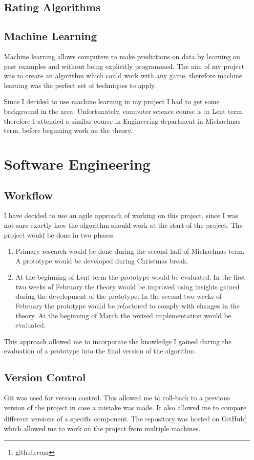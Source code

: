 \documentclass[12pt,a4paper]{book}
\begin{document}
\subsection{Rating Algorithms}

\subsection{Machine Learning}
Machine learning allows computers to make predictions on data by learning on past examples and without being explicitly programmed.
The aim of my project was to create an algorithm which could work with any game, therefore machine learning was the perfect set of techniques to apply.

Since I decided to use machine learning in my project I had to get some background in the area.
Unfortunately, computer science course is in Lent term, therefore I attended a similar course in Engineering department in Michaelmas term, before beginning work on the theory.
\section{Software Engineering}
\subsection{Workflow}
I have decided to use an agile approach of working on this project, since I was not sure exactly how the algorithm should work at the start of the project.
The project would be done in two phases:
\begin{enumerate}
\item Primary research would be done during the second half of Michaelmas term.
A prototype would be developed during Christmas break.
\item At the beginning of Lent term the prototype would be evaluated.
In the first two weeks of February the theory would be improved using insights gained during the development of the prototype.
In the second two weeks of February the prototype would be refactored to comply with changes in the theory.
At the beginning of March the revised implementation would be evaluated.
\end{enumerate}
This approach allowed me to incorporate the knowledge I gained during the evaluation of a prototype into the final version of the algorithm.
\subsection{Version Control}
Git was used for version control.
This allowed me to roll-back to a previous version of the project in case a mistake was made.
It also allowed me to compare different versions of a specific component.
The repository was hosted on GitHub\footnote{github.com} which allowed me to work on the project from multiple machines.
\end{document}

